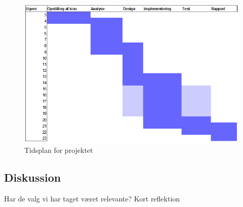 \documentclass[rapport.tex]{subfiles}
\begin{document}
	
	\begin{figure}
	\centering
	\includegraphics[width=0.9\linewidth]{Tidsplan}
	\caption{Tidsplan for projektet}
	\label{fig:Tidsplan}
	\end{figure}
	
	\subsection{Diskussion}
	Har de valg vi har taget været relevante? Kort reflektion
		
\end{document}
